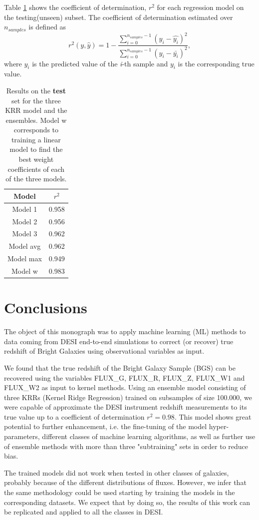 \documentclass[]{article}
\begin{document}
Table \ref{table:test-result} shows the coefficient of determination, $r^2$  for each regression model on the testing(unseen) subset. The coefficient of determination estimated over $n_{samples}$ is defined as
\begin{equation}
	r^2 (y, \hat{y}) = 1 - \frac{\sum_{i = 0}^{n_{samples} - 1} \left(y_i - \hat{y_i}\right)^2}{\sum_{i = 0}^{n_{samples} - 1} \left(y_i - \bar{y_i}\right)^2},
\end{equation}
where $\hat{y_i}$ is the predicted value of the \textit{i}-th sample and $y_i$ is the corresponding true value.



\begin{table}[h!]
	\centering
	\begin{tabular}{|c|c|}
		\hline 
		Model & $r^2$ \\ 
		\hline 
		Model 1 & 0.958 \\ 
		\hline 
		Model 2 & 0.956 \\ 
		\hline 
		Model 3 & 0.962 \\ 
		\hline 
		Model avg & 0.962 \\ 
		\hline 
		Model max & 0.949 \\ 
		\hline 
		Model w & 0.983 \\ 
		\hline 
	\end{tabular} 
	\caption{Results on the \textbf{test} set for the three KRR model and the ensembles. Model w corresponds to training a linear model to find the best weight coefficients of each of the three models.}
	\label{table:test-result}
\end{table}

\section{Conclusions}
The object of this monograph was to apply machine learning (ML) methods to data coming from DESI end-to-end simulations to correct (or recover) true redshift of Bright Galaxies using observational variables as input. 

We found that the true redshift of the Bright Galaxy Sample (BGS) can be recovered using the variables FLUX\_G, FLUX\_R, FLUX\_Z, FLUX\_W1 and FLUX\_W2 as input to kernel methods. Using an ensemble model consisting of three KRRs (Kernel Ridge Regression) trained on subsamples of size 100.000, we were capable of approximate the DESI instrument redshift measurements to its true value up to a coefficient of determination $r^2 = 0.98$.  This model shows great potential to further enhancement, i.e. the fine-tuning of the model hyper-parameters, different classes of machine learning algorithms, as well as further use of ensemble methods with more than three "subtraining" sets in order to reduce bias.

The trained models did not work when tested in other classes of galaxies, probably because of the different distributions of fluxes. However, we infer that the same methodology could be used starting by training the models in the corresponding datasets. We expect that by doing so, the results of this work can be replicated and applied to all the classes in DESI. 
\end{document}
